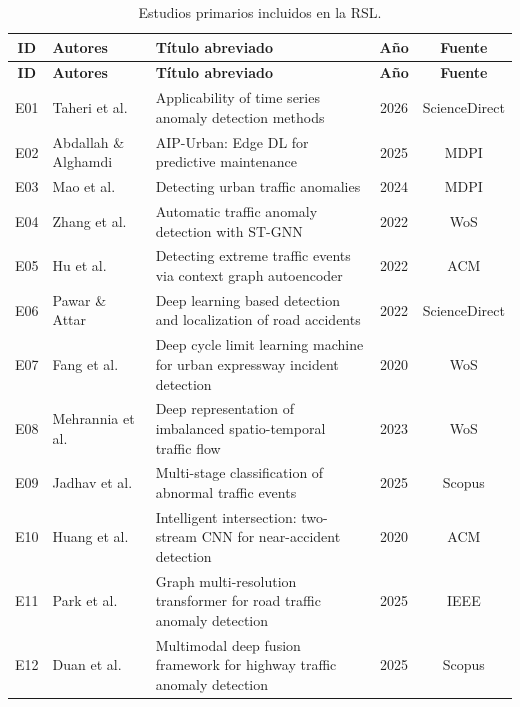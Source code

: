 \documentclass[12pt, a4paper]{article}
\begin{document}
\begin{longtable}{cp{3.2cm}p{5.0cm}cc}
\caption{Estudios primarios incluidos en la RSL.\label{tab:ap_estudios}}\\
\toprule
\textbf{ID} & \textbf{Autores} & \textbf{T\'{i}tulo abreviado} & \textbf{A\~{n}o} & \textbf{Fuente} \\
\midrule\endfirsthead
\midrule\textbf{ID}&\textbf{Autores}&\textbf{T\'{i}tulo abreviado}&\textbf{A\~{n}o}&\textbf{Fuente}\\
\midrule\endhead\endfoot\bottomrule\endlastfoot
E01 & Taheri et al.            & Applicability of time series anomaly detection methods                         & 2026 & ScienceDirect \\
E02 & Abdallah \& Alghamdi     & AIP-Urban: Edge DL for predictive maintenance                                  & 2025 & MDPI \\
E03 & Mao et al.               & Detecting urban traffic anomalies                                               & 2024 & MDPI \\
E04 & Zhang et al.             & Automatic traffic anomaly detection with ST-GNN                                 & 2022 & WoS \\
E05 & Hu et al.                & Detecting extreme traffic events via context graph autoencoder                  & 2022 & ACM \\
E06 & Pawar \& Attar           & Deep learning based detection and localization of road accidents                & 2022 & ScienceDirect \\
E07 & Fang et al.              & Deep cycle limit learning machine for urban expressway incident detection       & 2020 & WoS \\
E08 & Mehrannia et al.         & Deep representation of imbalanced spatio-temporal traffic flow                  & 2023 & WoS \\
E09 & Jadhav et al.            & Multi-stage classification of abnormal traffic events                           & 2025 & Scopus \\
E10 & Huang et al.             & Intelligent intersection: two-stream CNN for near-accident detection            & 2020 & ACM \\
E11 & Park et al.              & Graph multi-resolution transformer for road traffic anomaly detection           & 2025 & IEEE \\
E12 & Duan et al.              & Multimodal deep fusion framework for highway traffic anomaly detection          & 2025 & Scopus \\

\end{longtable}
\end{document}
